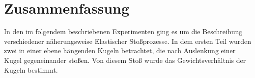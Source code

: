 
\section{Zusammenfassung}
In den im folgendem beschriebenen Experimenten ging es um die Beschreibung verschiedener näherungsweise Elastischer  Stoßprozesse.  In dem ersten Teil wurden zwei in einer ebene hängenden Kugeln betrachtet, die nach Auslenkung einer Kugel gegeneinander stoßen. Von diesem Stoß wurde das Gewichtsverhältnis der Kugeln bestimmt.
